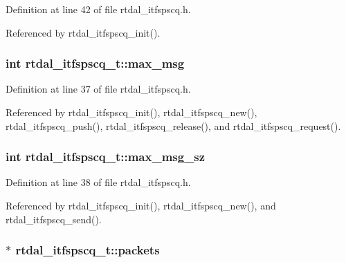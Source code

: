 Definition at line 42 of file rtdal\-\_\-itfspscq.\-h.



Referenced by rtdal\-\_\-itfspscq\-\_\-init().

\hypertarget{structrtdal__itfspscq__t_a9a7ca95050337e31cf161653e77501de}{
\subsubsection[{max\-\_\-msg}]{\setlength{\rightskip}{0pt plus 5cm}int rtdal\-\_\-itfspscq\-\_\-t\-::max\-\_\-msg}}\label{structrtdal__itfspscq__t_a9a7ca95050337e31cf161653e77501de}


Definition at line 37 of file rtdal\-\_\-itfspscq.\-h.



Referenced by rtdal\-\_\-itfspscq\-\_\-init(), rtdal\-\_\-itfspscq\-\_\-new(), rtdal\-\_\-itfspscq\-\_\-push(), rtdal\-\_\-itfspscq\-\_\-release(), and rtdal\-\_\-itfspscq\-\_\-request().

\hypertarget{structrtdal__itfspscq__t_a7b1b411ad0e83163ef0a2a2352a7ad1d}{
\subsubsection[{max\-\_\-msg\-\_\-sz}]{\setlength{\rightskip}{0pt plus 5cm}int rtdal\-\_\-itfspscq\-\_\-t\-::max\-\_\-msg\-\_\-sz}}\label{structrtdal__itfspscq__t_a7b1b411ad0e83163ef0a2a2352a7ad1d}


Definition at line 38 of file rtdal\-\_\-itfspscq.\-h.



Referenced by rtdal\-\_\-itfspscq\-\_\-init(), rtdal\-\_\-itfspscq\-\_\-new(), and rtdal\-\_\-itfspscq\-\_\-send().

\hypertarget{structrtdal__itfspscq__t_a08b1f24f2968b598c462a112a9bfd824}{
\subsubsection[{packets}]{$\ast$ rtdal\-\_\-itfspscq\-\_\-t\-::packets}}\label{structrtdal__itfspscq__t_a08b1f24f2968b598c462a112a9bfd824}


